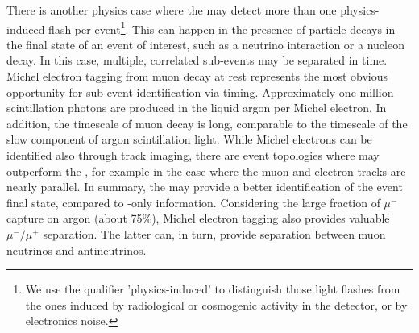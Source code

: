 There is another physics case where the  may detect more than one physics-induced flash per  event\footnote{We use the qualifier 'physics-induced' to distinguish those light flashes from the ones induced by radiological or cosmogenic activity in the detector, or by electronics noise.}. This can happen in the presence of particle decays in the final state of an event of interest, such as a neutrino interaction or a nucleon decay. In this case, multiple, correlated sub-events may be separated in time. Michel electron tagging from muon decay at rest represents the most obvious opportunity for sub-event identification via  timing. Approximately one million scintillation photons are produced in the liquid argon per Michel electron. In addition, the timescale of muon decay is long, comparable to the timescale of the slow component of argon scintillation light. While Michel electrons can be identified also through  track imaging, there are event topologies where  may outperform the , for example in the case where the muon and electron tracks are nearly parallel. In summary, the  may provide a better identification of the event final state, compared to -only information. Considering the large fraction of $\mu^-$ capture on argon (about 75\%), Michel electron tagging also provides valuable $\mu^-/\mu^+$ separation. The latter can, in turn, provide separation between muon neutrinos and antineutrinos. 
